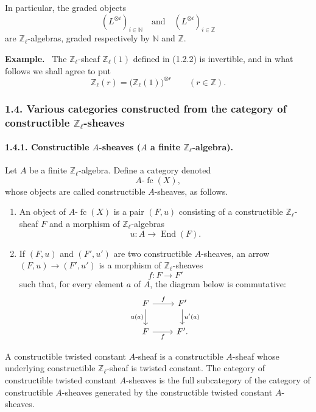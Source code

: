 \documentclass[11pt]{article}
\newenvironment{statement}[1]{\par\medskip\noindent\textbf{#1.}\ }{\par\medskip}
\providecommand{\End}{\operatorname{End}}
\providecommand{\End}{\operatorname{End}}
\providecommand{\fc}{\operatorname{fc}}
\begin{document}
In particular, the graded objects
\[
(L^{\otimes i})_{i\in\mathbb N}\quad\text{and}\quad(L^{\otimes i})_{i\in\mathbb Z}
\]
are \(\mathbb Z_\ell\)-algebras, graded respectively by \(\mathbb N\) and \(\mathbb Z\).

\begin{statement}{Example}
The \(\mathbb Z_\ell\)-sheaf \(\mathbb Z_\ell(1)\) defined in (1.2.2) is invertible, and in what follows we shall agree to put
\[
\mathbb Z_\ell(r)=\bigl(\mathbb Z_\ell(1)\bigr)^{\otimes r}\qquad (r\in\mathbb Z).
\]
\end{statement}

\subsubsection*{1.4. Various categories constructed from the category of constructible \(\mathbb Z_\ell\)-sheaves}

\paragraph{1.4.1. Constructible \(A\)-sheaves (\(A\) a finite \(\mathbb Z_\ell\)-algebra).}
Let \(A\) be a finite \(\mathbb Z_\ell\)-algebra. Define a category denoted
\[
A\text{-}\fc(X),
\]
whose objects are called constructible \(A\)-sheaves, as follows.

\begin{enumerate}[label=(\roman*)]
\item An object of \(A\text{-}\fc(X)\) is a pair \((F,u)\) consisting of a constructible \(\mathbb Z_\ell\)-sheaf \(F\) and a morphism of \(\mathbb Z_\ell\)-algebras
\[
u:A\longrightarrow \End(F).
\]
\item If \((F,u)\) and \((F',u')\) are two constructible \(A\)-sheaves, an arrow \((F,u)\to(F',u')\) is a morphism of \(\mathbb Z_\ell\)-sheaves
\[
f:F\longrightarrow F'
\]
such that, for every element \(a\) of \(A\), the diagram below is commutative:
\[
\begin{tikzcd}
F \arrow[r,"f"] \arrow[d,"u(a)"'] & F' \arrow[d,"u'(a)"]\\
F \arrow[r,"f"'] & F'.
\end{tikzcd}
\]
\end{enumerate}

A constructible twisted constant \(A\)-sheaf is a constructible \(A\)-sheaf whose underlying constructible \(\mathbb Z_\ell\)-sheaf is twisted constant. The category of constructible twisted constant \(A\)-sheaves is the full subcategory of the category of constructible \(A\)-sheaves generated by the constructible twisted constant \(A\)-sheaves.
\end{document}
